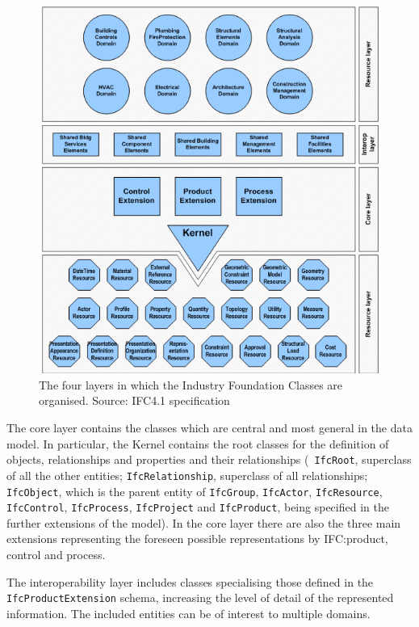 \begin{figure}
	\begin{center}
		\includegraphics[width=\linewidth]{figs/IFC4LayeredArchitecture.png}
		\caption{{The four layers in which the Industry Foundation Classes are organised. Source: IFC4.1 specification}}%
		\label{fig:ifclayers}
	\end{center}
\end{figure}

The core layer contains the classes which are central and most general in the data model.
In particular, the Kernel contains the root classes for the definition of objects, relationships and properties and their relationships (\eg\ \texttt{IfcRoot}, superclass of all the other entities; \texttt{IfcRelationship}, superclass of all relationships; \texttt{IfcObject}, which is the parent entity of \texttt{IfcGroup}, \texttt{IfcActor}, \texttt{IfcResource}, \texttt{Ifc\-Con\-trol}, \texttt{IfcProcess}, \texttt{IfcProject} and \texttt{IfcProduct}, being specified in the further extensions of the model).
In the core layer there are also the three main extensions representing the foreseen possible representations by IFC:\@ product, control and process.

The interoperability layer includes classes specialising those defined in the \texttt{IfcProductExtension} schema, increasing the level of detail of the represented information. The included entities can be of interest to multiple domains.

